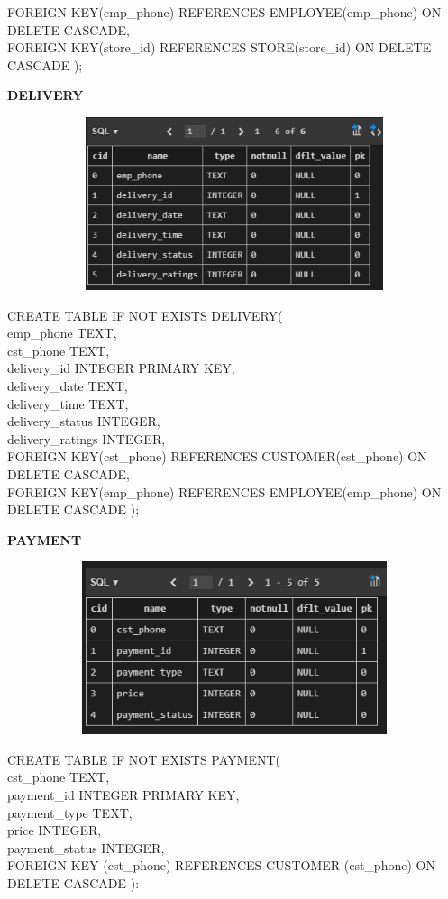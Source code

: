 \documentclass[12pt,a4paper]{report}
\begin{document}
FOREIGN KEY(emp\_phone) REFERENCES EMPLOYEE(emp\_phone) ON DELETE CASCADE,\\
FOREIGN KEY(store\_id) REFERENCES STORE(store\_id) ON DELETE CASCADE );\\
\begin{flushleft}
\textbf{DELIVERY}\\
\end{flushleft}
\begin{figure}[hbtp]
\centering
\includegraphics[width=5in,height=2in]{../fig/delivery}\\
\end{figure}
CREATE TABLE IF NOT EXISTS DELIVERY(\\
emp\_phone TEXT,\\
cst\_phone TEXT,\\
delivery\_id INTEGER PRIMARY KEY,\\
delivery\_date TEXT,\\
delivery\_time TEXT,\\
delivery\_status INTEGER,\\
delivery\_ratings INTEGER,\\
FOREIGN KEY(cst\_phone) REFERENCES CUSTOMER(cst\_phone) ON DELETE CASCADE,\\
FOREIGN KEY(emp\_phone) REFERENCES EMPLOYEE(emp\_phone) ON DELETE CASCADE );\\
\begin{flushleft}
\textbf{PAYMENT}\\
\end{flushleft}
\begin{figure}[hbtp]
\centering
\includegraphics[width=5in,height=2in]{../fig/payment}
\end{figure}
CREATE TABLE IF NOT EXISTS PAYMENT(\\
cst\_phone TEXT,\\
payment\_id INTEGER PRIMARY KEY,\\
payment\_type TEXT,\\
price INTEGER,\\
payment\_status INTEGER,\\
FOREIGN KEY (cst\_phone) REFERENCES CUSTOMER (cst\_phone) ON DELETE CASCADE ):\\
\end{document}
